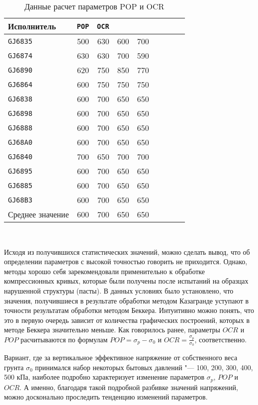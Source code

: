 \begin{table}[]
    \centering
    \caption{Данные расчет параметров POP и OCR} \label{tab:OCR}
    \begin{tabular}{@{}lrrrrrrrr@{}}
    \toprule
    Исполнитель & \texttt{POP} &	\texttt{OCR} &  \\ \midrule
    \texttt{GJ6835}	& 500	& 630	& 600	& 700 &&&& \\
    \texttt{GJ6874}	& 630	& 630	& 700	& 590 &&&& \\
    \texttt{GJ6890}	& 620	& 750	& 850	& 770 &&&& \\
    \texttt{GJ6864}	& 600	& 750	& 750	& 750 &&&& \\
    \texttt{GJ6838} & 600	& 700	& 650	& 650 &&&& \\
    \texttt{GJ6898} & 600	& 700	& 650	& 650 &&&& \\
    \texttt{GJ6888} & 600	& 700	& 650	& 650 &&&& \\
    \texttt{GJ68А0} & 600	& 700	& 650	& 650 &&&& \\
    \texttt{GJ6840} & 700	& 650	& 700	& 700 &&&& \\ 
    \texttt{GJ6895} & 600 & 700 & 650 & 650 &&&& \\
    \texttt{GJ6885} & 600 & 700 & 650 & 650 &&&& \\
    \texttt{GJ68B3} & 600 & 700 & 650 & 650 &&&& \\ 
    Среднее значение & 600 & 700 & 650 & 650 \\ \midrule
    \bottomrule 
    \end{tabular}
    \\ 
\end{table}

Исходя из получившихся статистических значений, можно сделать вывод, что об определении параметров с высокой точностью говорить не приходится. Однако, методы хорошо себя зарекомендовали применительно к обработке компрессионных кривых, которые были получены после испытаний на образцах нарушенной структуры (пасты). В данных условиях было установлено, что значения, получившиеся в результате обработки методом Казагранде уступают в точности результатам обработки методом Беккера. Интуитивно можно понять, что это в первую очередь зависит от количества графических построений, которых в методе Беккера значительно меньше. Как говорилось ранее, параметры $OCR$ и $POP$ расчитываются по формулам $POP = \sigma_p - \sigma_0$ и $OCR = \frac{\sigma_p}{\sigma_0}$, соответственно. 
    

Вариант, где за вертикальное эффективное напряжение от собственного веса грунта $\sigma_0$ принимался набор некоторых бытовых давлений "--- 100, 200, 300, 400, 500 кПа, наиболее подробно характеризует изменение параметров $\sigma_p$, $POP$ и $OCR$. А именно, благодаря такой подробной разбивке значений напряжений, можно досконально проследить тенденцию изменений параметров.